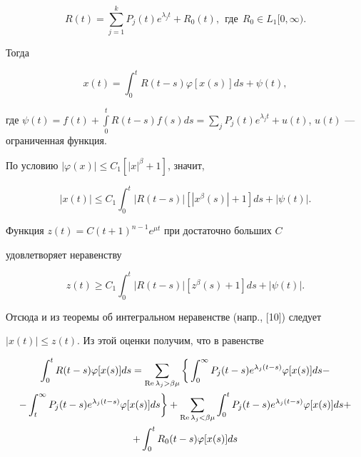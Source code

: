 \begin{equation}\label{r}


R(t)=\sum_{j=1}^k P_j (t) e^{\lambda_j t} + R_0 (t),


\ \ \text{где}\ \ R_0 \in L_1[0,\infty).


\end{equation}


Тогда


\begin{equation}\label{2}


x(t)=\int_0^t R(t-s) \varphi [ x(s) ] ds+ \psi(t),


\end{equation}


где $\psi(t)=f(t)+\int\limits_0^t R(t-s)f(s)ds=\sum\limits_j P_j (t) e^{


\lambda_j t} + u(t)$, $u(t)$ --- ограниченная функция.


По условию $|\varphi(x)|\le C_1[|x|^\beta+1]$, значит,


$$


|x(t)|\le C_1\int_0^t |R(t-s)|[|x^\beta(s)|+1]ds+|\psi(t)|.


$$


Функция $z(t)=C(t+1)^{n-1} e^{\mu t}$ при достаточно больших $C$


удовлетворяет неравенству


$$


z(t) \ge C_1\int_0^t |R(t-s)|[z^\beta(s)+1]ds+ |\psi(t)|.


$$


Отсюда и из теоремы об интегральном неравенстве (напр., [10]) следует


$|x(t)| \le z(t)$. Из этой оценки получим, что в равенстве


\begin{multline*}


\int_0^t R(t-s) \varphi [ x(s) ] ds=\sum_{\re\lambda_j >


\beta \mu} \bigg\{\int_0^\infty P_j (t-s) e^{\lambda_j (t-s)} \varphi


[ x(s) ] ds - \\


%


-\int_t^\infty P_j (t-s) e^{\lambda_j (t-s)} \varphi [ x(s)


] ds \bigg\} + \sum_{\re\lambda_j < \beta \mu} \int_0^t P_j (t-s)


e^{\lambda_j (t-s)} \varphi [ x(s) ] ds+ \\


%


+\int_0^t R_0(t-s) \varphi [ x(s)] ds


\end{multline*}


